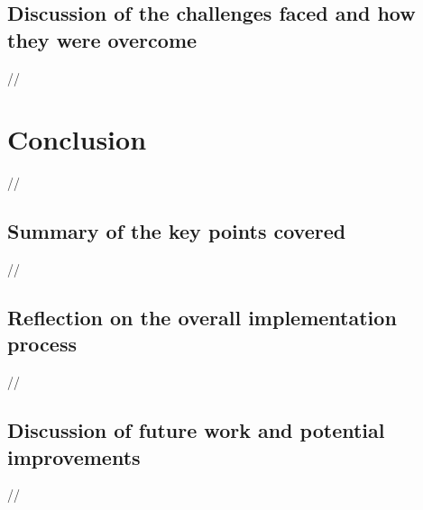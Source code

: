 \subsection {Discussion of the challenges faced and how they were overcome}

//
    \section {Conclusion}
//
    \subsection {Summary of the key points covered}
//
    \subsection {Reflection on the overall implementation process}
//
    \subsection {Discussion of future work and potential improvements}

    //